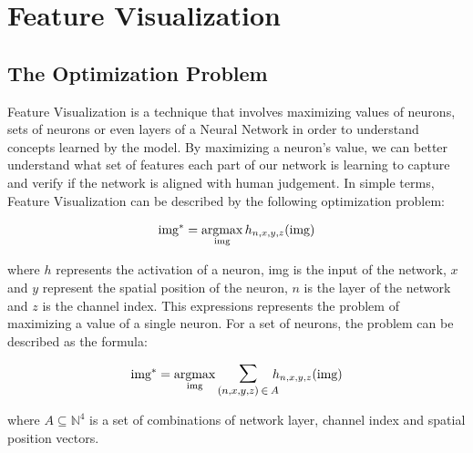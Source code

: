 
% 

\chapter{Feature Visualization}

\section{The Optimization Problem}

Feature Visualization is a technique that involves maximizing values of neurons, sets of neurons or even layers of a Neural Network in order to understand concepts learned by the model.
By maximizing a neuron's value, we can better understand what set of features each part of our network is learning to capture and verify if the network is aligned with human judgement.
In simple terms, Feature Visualization can be described by the following optimization problem:

\begin{equation}
    \text{img}^* = \operatorname*{argmax}_{\text{img}} h_{n, x, y, z} (\text{img})
    \label{eq:feat_vis_optimization}
\end{equation}

\noindent where \(h\) represents the activation of a neuron, img is the input of the network, \(x\) and \(y\) represent the spatial position of the neuron, \(n\) is the layer of the network and \(z\) is the channel index.
This expressions represents the problem of maximizing a value of a single neuron. For a set of neurons, the problem can be described as the formula:

\begin{equation}
    \text{img}^* =  \argmax_{\text{img}} \mathlarger{\mathlarger{\sum}}_{(n, x, y, z) \: \in \: A} \!\!\! h_{n, x, y, z} (\text{img})
    \label{eq:feat_vis_optimization_multivar}
\end{equation}

where \(A \subseteq \mathbb{N}^4\) is a set of combinations of network layer, channel index and spatial position vectors.

